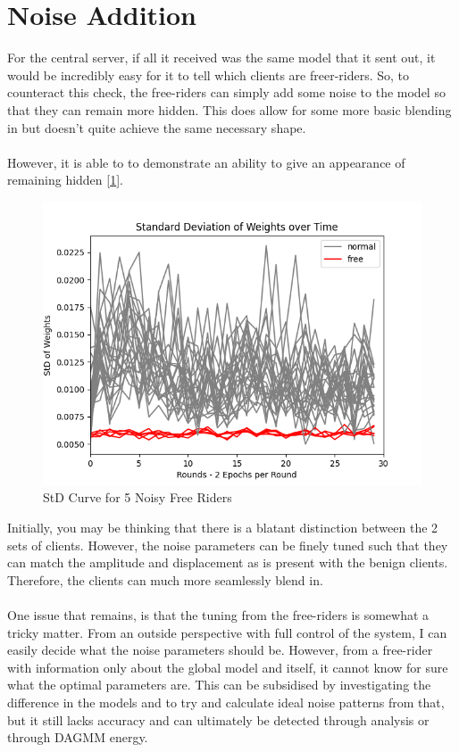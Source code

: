 \section{Noise Addition}
For the central server, if all it received was the same model that it sent out, it would be incredibly easy for it to tell which clients are freer-riders.
So, to counteract this check, the free-riders can simply add some noise to the model so that they can remain more hidden.
This does allow for some more basic blending in but doesn't quite achieve the same necessary shape.
\\ \\ 
However, it is able to to demonstrate an ability to give an appearance of remaining hidden [\ref{fig:std_noisy}].
\begin{figure}[htbp]
	\centering
    \includegraphics[scale=0.5]{free_riders/graphs/noisy5.png}
	\caption{StD Curve for 5 Noisy Free Riders}
	\label{fig:std_noisy}
\end{figure}
Initially, you may be thinking that there is a blatant distinction between the 2 sets of clients.
However, the noise parameters can be finely tuned such that they can match the amplitude and displacement as is present with the benign clients.
Therefore, the clients can much more seamlessly blend in.
\\ \\
One issue that remains, is that the tuning from the free-riders is somewhat a tricky matter.
From an outside perspective with full control of the system, I can easily decide what the noise parameters should be.
However, from a free-rider with information only about the global model and itself, it cannot know for sure what the optimal parameters are.
This can be subsidised by investigating the difference in the models and to try and calculate ideal noise patterns from that, but it still lacks accuracy and can ultimately be detected through analysis or through DAGMM energy.



